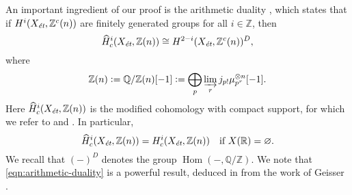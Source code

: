 \documentclass{article}
\DeclareMathOperator{\Hom}{Hom}
\newcommand{\QQ}{\mathbb{Q}}
\newcommand{\RR}{\mathbb{R}}
\newcommand{\ZZ}{\mathbb{Z}}
\renewcommand{\emptyset}{\varnothing}
\newcommand{\et}{\text{\it \'{e}t}}
\newcommand{\dfn}{\mathrel{\mathop:}=}
\theoremstyle{myplain}
\theoremstyle{mydefinition}
\begin{document}
An important ingredient of our proof is the arithmetic duality
\cite[Theorem~I]{Beshenov-Weil-etale-1}, which states that if
$H^i (X_\et, \ZZ^c (n))$ are finitely generated groups for all $i \in \ZZ$, then
\begin{equation}
  \label{eqn:arithmetic-duality}
  \widehat{H}^i_c (X_\et, \ZZ (n)) \cong
  H^{2-i} (X_\et, \ZZ^c (n))^D,
\end{equation}
where
\begin{equation}
  \label{eqn:definition-of-Z(n)}
  \ZZ (n) \dfn \QQ/\ZZ (n) [-1] \dfn
  \bigoplus_p \varinjlim_r j_{p!} \mu_{p^r}^{\otimes n} [-1].
\end{equation}
Here $\widehat{H}^i_c (X_\et, \ZZ (n))$ is the modified cohomology with compact
support, for which we refer to \cite[\S 2]{Geisser-Schmidt-2018} and
\cite[Appendix~B]{Beshenov-Weil-etale-1}. In particular,
\[
  \widehat{H}^i_c (X_\et, \ZZ (n)) = H^i_c (X_\et, \ZZ (n))
  \quad
  \text{if }X (\RR) = \emptyset.
\]
We recall that $(-)^D$ denotes the group $\Hom (-, \QQ/\ZZ)$. We note that
\eqref{eqn:arithmetic-duality} is a powerful result, deduced in
\cite{Beshenov-Weil-etale-1} from the work of Geisser \cite{Geisser-2010}.
\end{document}
